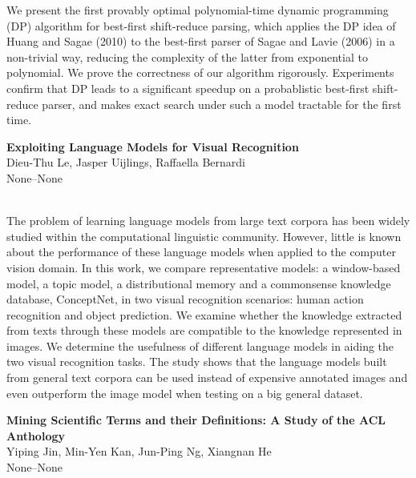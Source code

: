 \documentclass[twoside,makeidx]{book}
\begin{document}
\nopagebreak%
\noindent%
{\small We present the first provably optimal polynomial-time dynamic programming (DP) algorithm for best-first shift-reduce parsing, which applies the DP idea of Huang and Sagae (2010) to the best-first parser of Sagae and Lavie (2006) in a non-trivial way, reducing the complexity of the latter from exponential to polynomial. We prove the correctness of our algorithm rigorously. Experiments confirm that DP leads to a significant speedup on a probablistic best-first shift-reduce parser, and makes exact search under such a model tractable for the first time.}
\par\vspace{2em}\noindent%
\begin{minipage}{\linewidth}%
\begin{center}
\textbf{\normalsize Exploiting Language Models for Visual Recognition}\\
\normalsize  Dieu-Thu Le,  Jasper Uijlings,  Raffaella Bernardi\\
{\small None--None}\\
\end{center}
\end{minipage}\\[0.5em]
\nopagebreak%
\noindent%
{\small The problem of learning language models from large text corpora has been widely studied within the computational linguistic community. However, little is known about the performance of these language models when applied to the computer vision domain. In this work, we compare representative models: a window-based model, a topic model, a distributional memory and a commonsense knowledge database, ConceptNet, in two visual recognition scenarios: human action recognition and object prediction. We examine whether the knowledge extracted from texts through these models are compatible to the knowledge represented in images. We determine the usefulness of different language models in aiding the two visual recognition tasks. The study shows that the language models built from general text corpora can be used instead of expensive annotated images and even outperform the image model when testing on a big general dataset.}
\par\vspace{2em}\noindent%
\begin{minipage}{\linewidth}%
\begin{center}
\textbf{\normalsize Mining Scientific Terms and their Definitions: A Study of the ACL Anthology}\\
\normalsize  Yiping Jin,  Min-Yen Kan,  Jun-Ping Ng,  Xiangnan He\\
{\small None--None}\\
\end{center}
\end{minipage}\\[0.5em]
\end{document}
